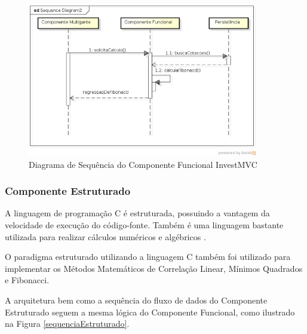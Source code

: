 \begin{figure}[H]
\centering
\includegraphics[width=0.9\textwidth]{figuras/sequenciaFuncional}
\caption{Diagrama de Sequência do Componente Funcional InvestMVC} 
\label{sequenciaFuncional}
\end{figure}

\subsubsection{Componente Estruturado}

A linguagem de programação C é estruturada, possuindo a vantagem da velocidade de execução do código-fonte. Também é uma linguagem bastante utilizada para realizar cálculos numéricos e algébricos \cite{gustavo}. 

O paradigma estruturado utilizando a linguagem C também foi utilizado para implementar os Métodos Matemáticos de Correlação Linear, Mínimos Quadrados e Fibonacci.

A arquitetura bem como a sequência do fluxo de dados do Componente Estruturado seguem a mesma lógica do Componente Funcional, como ilustrado na Figura \ref{sequenciaEstruturado}.

